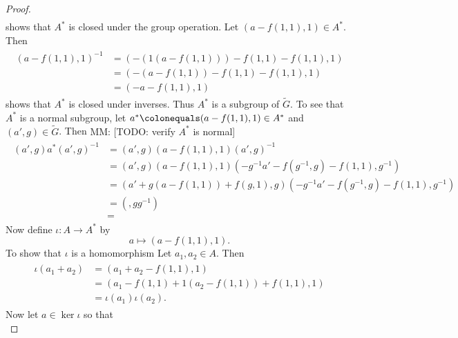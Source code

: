 \documentclass{dcthesis}
\newcommand{\mm}[1]{{\color{blue} \sf MM: [#1]}}
\newcommand{\wt}[1]{\widetilde{#1}}
\renewcommand{\ker}{\operatorname{ker}}
\numberwithin{equation}{section}
\theoremstyle{definition}
\theoremstyle{remark}
\begin{document}
{{\begin{proof}
\begin{align}
      \end{align}
      shows that $A^*$ is closed under the group operation.
      Let $(a-f(1,1),1)\in A^*$.
      Then
      \begin{align}
        \label{eqn:subgroupinversesAstar}
        \begin{split}
          (a-f(1,1),1)^{-1}
          &=(-(1(a-f(1,1)))-f(1,1)-f(1,1), 1)\\
          &=(-(a-f(1,1))-f(1,1)-f(1,1), 1)\\
          &=(-a-f(1,1), 1)
        \end{split}
      \end{align}
      shows that $A^*$ is closed under inverses.
      Thus $A^*$ is a subgroup of $\wt{G}$.
      To see that $A^*$ is a normal subgroup,
      let $a^*\colonequals (a-f(1,1),1)\in A^*$
      and $(a',g)\in\wt{G}$.
      Then
      \mm{TODO: verify $A^*$ is normal}
      \begin{align}
        \label{eqn:Astarnormal}
        \begin{split}
          (a',g)a^*(a',g)^{-1}
          &=(a',g)(a-f(1,1),1)(a',g)^{-1}\\
          &=(a',g)(a-f(1,1),1)(-g^{-1}a'-f(g^{-1},g)-f(1,1),g^{-1})\\
          &=(a'+g(a-f(1,1))+f(g,1),g)(-g^{-1}a'-f(g^{-1},g)-f(1,1),g^{-1})\\
          &=(,gg^{-1})\\
          &=
        \end{split}
      \end{align}
      Now define $\iota\colon A\to A^*$
      by
      \begin{equation}
        \label{eqn:iotaAstar}
        a\mapsto
        (a-f(1,1),1).
      \end{equation}
      To show that $\iota$ is a homomorphism
      Let $a_1,a_2\in A$.
      Then
      \begin{align}
        \label{eqn:iotahomo}
        \begin{split}
          \iota(a_1+a_2)
          &=(a_1+a_2-f(1,1),1)\\
          &=(a_1-f(1,1)+1(a_2-f(1,1))+f(1,1), 1)\\
          &=\iota(a_1)\iota(a_2).
        \end{split}
      \end{align}
      Now let $a\in\ker\iota$ so that
      \begin{equation}
        \label{eqn:keriota}

\end{equation}
\end{proof}}}
\end{document}
